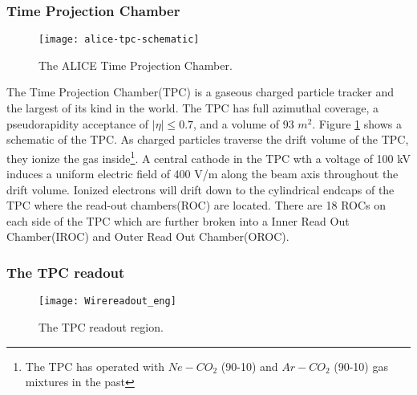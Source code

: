 
\subsubsection{Time Projection Chamber}\label{sec:tpc}

\begin{figure}[h]
\texttt{[image: alice-tpc-schematic]}
\centering
\caption{The ALICE Time Projection Chamber\cite{2010NIMPA.622..316A}.}
\label{fig:TPC}
\end{figure}

The Time Projection Chamber(TPC)\cite{2010NIMPA.622..316A} is a gaseous charged particle tracker and the largest of its kind in the world.  The TPC has full azimuthal coverage, a pseudorapidity acceptance of $ \left | \eta \right | \leq 0.7$, and a volume of 93 $m^{2}$.  Figure \ref{fig:TPC} shows a schematic of the TPC.  As charged particles traverse the drift volume of the TPC, they ionize the gas inside\footnote{The TPC has operated with $Ne-CO_{2}$ (90-10) and $Ar-CO_{2}$ (90-10) gas mixtures in the past}.  A central cathode in the TPC wth a voltage of 100 kV induces a uniform electric field of 400 V/m along the beam axis throughout the drift volume.  Ionized electrons will drift down to the cylindrical endcaps of the TPC where the read-out chambers(ROC) are located.  There are 18 ROCs on each side of the TPC which are further broken into a Inner Read Out Chamber(IROC) and Outer Read Out Chamber(OROC).  

\subsubsection{The TPC readout}\label{sec:tpcread}

\begin{figure}[h]
\texttt{[image: Wirereadout\_eng]}
\centering
\caption{The TPC readout region\cite{diener}.}
\label{fig:TPCreadout}
\end{figure}

